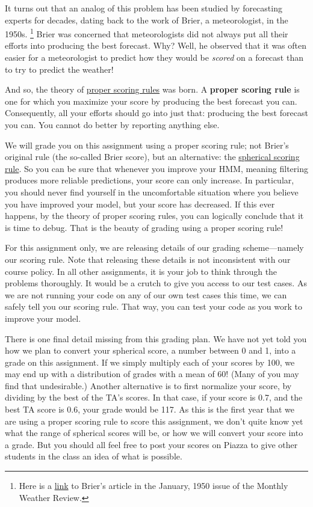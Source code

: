\documentclass{article}
\begin{document}
It turns out that an analog of this problem has been studied by forecasting experts for decades,
dating back to the work of Brier, a meteorologist, in the 1950s.%
\footnote{Here is a
  \href{https://web.archive.org/web/20171023012737/https://docs.lib.noaa.gov/rescue/mwr/078/mwr-078-01-0001.pdf}{link}
  to Brier's article in the January, 1950 issue of the Monthly Weather Review.}
Brier was concerned that meteorologists did not always put all their efforts into producing the best forecast.
Why?
Well, he observed that it was often easier for a meteorologist to predict
how they would be \emph{scored\/} on a forecast than to try to predict the weather!

And so, the theory of \href{https://en.wikipedia.org/wiki/Scoring_rule}{proper scoring rules} was born.
A \textbf{proper scoring rule} is one for which you maximize your score by producing the best forecast you can.
Consequently, all your efforts should go into just that: producing the best forecast you can.
You cannot do better by reporting anything else.

We will grade you on this assignment using a proper scoring rule;
not Brier's original rule (the so-called Brier score), but an alternative:
the \href{https://en.wikipedia.org/wiki/Scoring_rule#Spherical_scoring_rule}{spherical scoring rule}.
So you can be sure that whenever you improve your HMM,
meaning filtering produces more reliable predictions,
your score can only increase.
In particular, you should never find yourself in the uncomfortable situation
where you believe you have improved your model,
but your score has decreased.
If this ever happens, by the theory of proper scoring rules, you can logically conclude that it is time to debug.
That is the beauty of grading using a proper scoring rule!

For this assignment only, we are releasing details of our grading
scheme---namely our scoring rule.  Note that releasing these details
is not inconsistent with our course policy.  In all other assignments,
it is your job to think through the problems thoroughly.  It would be
a crutch to give you access to our test cases.  As we are not running
your code on any of our own test cases this time, we can safely tell
you our scoring rule.  That way, you can test your code as you work to
improve your model.
\fi

There is one final detail missing from this grading plan.  We have not
yet told you how we plan to convert your spherical score, a number
between 0 and 1, into a grade on this assignment.  If we simply
multiply each of your scores by 100, we may end up with a distribution
of grades with a mean of 60!  (Many of you may find that undesirable.)
Another alternative is to first normalize your score, by dividing by
the best of the TA's scores.  In that case, if your score is 0.7, and
the best TA score is 0.6, your grade would be 117.  As this is the
first year that we are using a proper scoring rule to score this
assignment, we don't quite know yet what the range of spherical scores
will be, or how we will convert your score into a grade.  But you
should all feel free to post your scores on Piazza to give other
students in the class an idea of what is possible.
\end{document}

